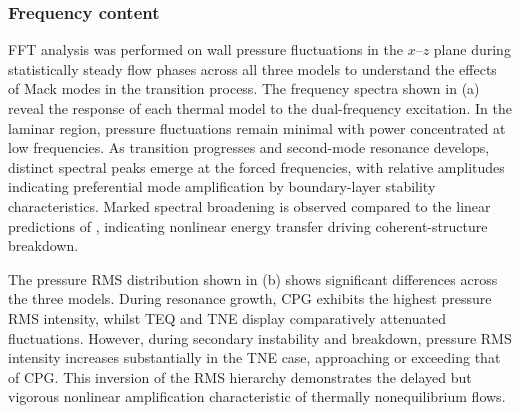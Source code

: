 \subsubsection{Frequency content}

FFT analysis was performed on wall pressure fluctuations in the $x$--$z$ plane during statistically steady flow phases across all three models to understand the effects of Mack modes in the transition process. The frequency spectra shown in (a) reveal the response of each thermal model to the dual-frequency excitation. In the laminar region, pressure fluctuations remain minimal with power concentrated at low frequencies. As transition progresses and second-mode resonance develops, distinct spectral peaks emerge at the forced frequencies, with relative amplitudes indicating preferential mode amplification by boundary-layer stability characteristics. Marked spectral broadening is observed compared to the linear predictions of , indicating nonlinear energy transfer driving coherent-structure breakdown.

The pressure RMS distribution shown in (b) shows significant differences across the three models. During resonance growth, \gls{CPG} exhibits the highest pressure RMS intensity, whilst \gls{TEQ} and \gls{TNE} display comparatively attenuated fluctuations. However, during secondary instability and breakdown, pressure RMS intensity increases substantially in the \gls{TNE} case, approaching or exceeding that of \gls{CPG}. This inversion of the RMS hierarchy demonstrates the delayed but vigorous nonlinear amplification characteristic of thermally nonequilibrium flows.


